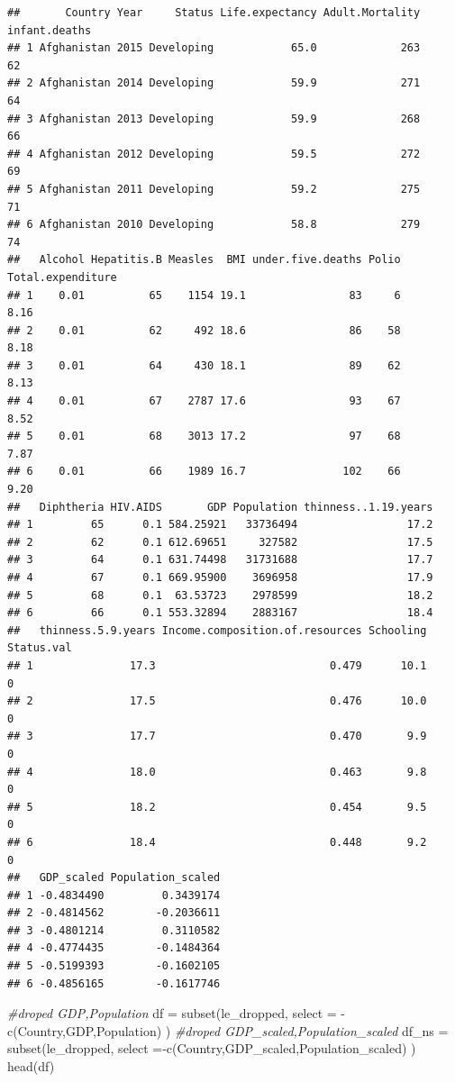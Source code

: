 \documentclass[
]{article}
\newenvironment{Shaded}{\begin{snugshade}}{\end{snugshade}}
\newcommand{\AttributeTok}[1]{\textcolor[rgb]{0.77,0.63,0.00}{#1}}
\newcommand{\CommentTok}[1]{\textcolor[rgb]{0.56,0.35,0.01}{\textit{#1}}}
\newcommand{\FunctionTok}[1]{\textcolor[rgb]{0.00,0.00,0.00}{#1}}
\newcommand{\NormalTok}[1]{#1}
\newcommand{\OtherTok}[1]{\textcolor[rgb]{0.56,0.35,0.01}{#1}}
\newcommand{\SpecialCharTok}[1]{\textcolor[rgb]{0.00,0.00,0.00}{#1}}
\begin{document}
\begin{verbatim}
##       Country Year     Status Life.expectancy Adult.Mortality infant.deaths
## 1 Afghanistan 2015 Developing            65.0             263            62
## 2 Afghanistan 2014 Developing            59.9             271            64
## 3 Afghanistan 2013 Developing            59.9             268            66
## 4 Afghanistan 2012 Developing            59.5             272            69
## 5 Afghanistan 2011 Developing            59.2             275            71
## 6 Afghanistan 2010 Developing            58.8             279            74
##   Alcohol Hepatitis.B Measles  BMI under.five.deaths Polio Total.expenditure
## 1    0.01          65    1154 19.1                83     6              8.16
## 2    0.01          62     492 18.6                86    58              8.18
## 3    0.01          64     430 18.1                89    62              8.13
## 4    0.01          67    2787 17.6                93    67              8.52
## 5    0.01          68    3013 17.2                97    68              7.87
## 6    0.01          66    1989 16.7               102    66              9.20
##   Diphtheria HIV.AIDS       GDP Population thinness..1.19.years
## 1         65      0.1 584.25921   33736494                 17.2
## 2         62      0.1 612.69651     327582                 17.5
## 3         64      0.1 631.74498   31731688                 17.7
## 4         67      0.1 669.95900    3696958                 17.9
## 5         68      0.1  63.53723    2978599                 18.2
## 6         66      0.1 553.32894    2883167                 18.4
##   thinness.5.9.years Income.composition.of.resources Schooling Status.val
## 1               17.3                           0.479      10.1          0
## 2               17.5                           0.476      10.0          0
## 3               17.7                           0.470       9.9          0
## 4               18.0                           0.463       9.8          0
## 5               18.2                           0.454       9.5          0
## 6               18.4                           0.448       9.2          0
##   GDP_scaled Population_scaled
## 1 -0.4834490         0.3439174
## 2 -0.4814562        -0.2036611
## 3 -0.4801214         0.3110582
## 4 -0.4774435        -0.1484364
## 5 -0.5199393        -0.1602105
## 6 -0.4856165        -0.1617746
\end{verbatim}

\begin{Shaded}
\begin{Highlighting}[]
\CommentTok{\#droped GDP,Population}
\NormalTok{df }\OtherTok{=} \FunctionTok{subset}\NormalTok{(le\_dropped, }\AttributeTok{select =} \SpecialCharTok{{-}}\FunctionTok{c}\NormalTok{(Country,GDP,Population) )}
\CommentTok{\#droped GDP\_scaled,Population\_scaled}
\NormalTok{df\_ns }\OtherTok{=} \FunctionTok{subset}\NormalTok{(le\_dropped, }\AttributeTok{select =}\SpecialCharTok{{-}}\FunctionTok{c}\NormalTok{(Country,GDP\_scaled,Population\_scaled) )}
\FunctionTok{head}\NormalTok{(df)}
\end{Highlighting}
\end{Shaded}
\end{document}
